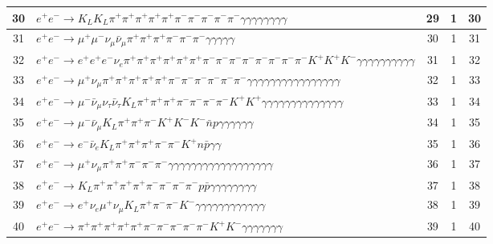\documentclass[landscape]{article}
\begin{document}
\begin{table}[htbp!]
\begin{tabular}{|c|>{\centering}p{18cm}|c|c|c|}
\hline
30 & $ e^{+} e^{-} \rightarrow K_{L} K_{L} \pi^{+} \pi^{+} \pi^{+} \pi^{+} \pi^{+} \pi^{-} \pi^{-} \pi^{-} \pi^{-} \pi^{-} \gamma \gamma \gamma \gamma \gamma \gamma \gamma \gamma $ & 29 & 1 & 30 \\
\hline
31 & $ e^{+} e^{-} \rightarrow \mu^{+} \mu^{-} \nu_{\mu} \bar{\nu}_{\mu} \pi^{+} \pi^{+} \pi^{+} \pi^{-} \pi^{-} \pi^{-} \gamma \gamma \gamma \gamma \gamma $ & 30 & 1 & 31 \\
\hline
32 & $ e^{+} e^{-} \rightarrow e^{+} e^{+} e^{-} \nu_{e} \pi^{+} \pi^{+} \pi^{+} \pi^{+} \pi^{+} \pi^{+} \pi^{-} \pi^{-} \pi^{-} \pi^{-} \pi^{-} \pi^{-} \pi^{-} \pi^{-} K^{+} K^{+} K^{-} \gamma \gamma \gamma \gamma \gamma \gamma \gamma \gamma \gamma \gamma $ & 31 & 1 & 32 \\
\hline
33 & $ e^{+} e^{-} \rightarrow \mu^{+} \nu_{\mu} \pi^{+} \pi^{+} \pi^{+} \pi^{+} \pi^{+} \pi^{-} \pi^{-} \pi^{-} \pi^{-} \pi^{-} \pi^{-} \gamma \gamma \gamma \gamma \gamma \gamma \gamma \gamma \gamma \gamma \gamma \gamma \gamma \gamma \gamma \gamma $ & 32 & 1 & 33 \\
\hline
34 & $ e^{+} e^{-} \rightarrow \mu^{-} \bar{\nu}_{\mu} \nu_{\tau} \bar{\nu}_{\tau} K_{L} \pi^{+} \pi^{+} \pi^{+} \pi^{-} \pi^{-} \pi^{-} \pi^{-} K^{+} K^{+} \gamma \gamma \gamma \gamma \gamma \gamma \gamma \gamma \gamma \gamma \gamma \gamma \gamma \gamma $ & 33 & 1 & 34 \\
\hline
35 & $ e^{+} e^{-} \rightarrow \mu^{-} \bar{\nu}_{\mu} K_{L} \pi^{+} \pi^{+} \pi^{-} K^{+} K^{-} K^{-} \bar{n} p \gamma \gamma \gamma \gamma \gamma \gamma $ & 34 & 1 & 35 \\
\hline
36 & $ e^{+} e^{-} \rightarrow e^{-} \bar{\nu}_{e} K_{L} \pi^{+} \pi^{+} \pi^{+} \pi^{-} \pi^{-} K^{+} n \bar{p} \gamma \gamma $ & 35 & 1 & 36 \\
\hline
37 & $ e^{+} e^{-} \rightarrow \mu^{+} \nu_{\mu} \pi^{+} \pi^{+} \pi^{-} \pi^{-} \pi^{-} \gamma \gamma \gamma \gamma \gamma \gamma \gamma \gamma \gamma \gamma \gamma \gamma \gamma \gamma \gamma \gamma \gamma \gamma $ & 36 & 1 & 37 \\
\hline
38 & $ e^{+} e^{-} \rightarrow K_{L} \pi^{+} \pi^{+} \pi^{+} \pi^{+} \pi^{-} \pi^{-} \pi^{-} \pi^{-} p \bar{p} \gamma \gamma \gamma \gamma \gamma \gamma \gamma \gamma $ & 37 & 1 & 38 \\
\hline
39 & $ e^{+} e^{-} \rightarrow e^{+} \nu_{e} \mu^{+} \nu_{\mu} K_{L} \pi^{+} \pi^{-} \pi^{-} K^{-} \gamma \gamma \gamma \gamma \gamma \gamma \gamma \gamma \gamma \gamma \gamma \gamma $ & 38 & 1 & 39 \\
\hline
40 & $ e^{+} e^{-} \rightarrow \pi^{+} \pi^{+} \pi^{+} \pi^{+} \pi^{+} \pi^{-} \pi^{-} \pi^{-} \pi^{-} \pi^{-} K^{+} K^{-} \gamma \gamma \gamma \gamma \gamma \gamma \gamma $ & 39 & 1 & 40 \\
\hline
\end{tabular}
\end{table}
\end{document}
